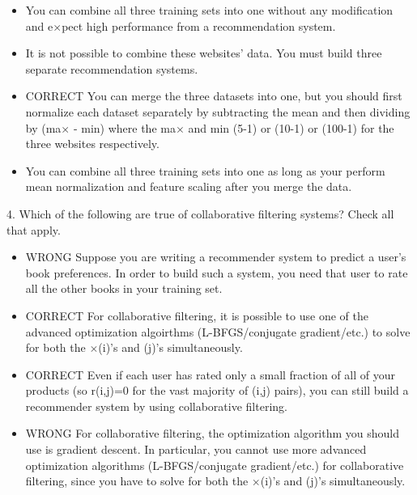 \begin{itemize}
\item You can combine all three training sets into one without any modification and e$ \times $pect high performance from a recommendation system.

\item It is not possible to combine these websites' data. You must build three separate recommendation systems.

\item CORRECT You can merge the three datasets into one, but you should first normalize each dataset separately by subtracting the mean and then dividing by (ma$ \times $ - min) where the ma$ \times $ and min (5-1) or (10-1) or (100-1) for the three websites respectively.

\item You can combine all three training sets into one as long as your perform mean normalization and feature scaling after you merge the data.

\end{itemize}

4. 
Which of the following are true of collaborative filtering systems? Check all that apply.

\begin{itemize}

\item WRONG Suppose you are writing a recommender system to predict a user's book preferences. In order to build such a system, you need that user to rate all the other books in your training set.

\item CORRECT For collaborative filtering, it is possible to use one of the advanced optimization algoirthms (L-BFGS/conjugate gradient/etc.) to solve for both the $ \times $(i)'s and \theta(j)'s simultaneously.

\item CORRECT Even if each user has rated only a small fraction of all of your products (so r(i,j)=0 for the vast majority of (i,j) pairs), you can still build a recommender system by using collaborative filtering.

\item WRONG For collaborative filtering, the optimization algorithm you should use is gradient descent. In particular, you cannot use more advanced optimization algorithms (L-BFGS/conjugate gradient/etc.) for collaborative filtering, since you have to solve for both the $ \times $(i)'s and \theta(j)'s simultaneously.

\end{itemize}

